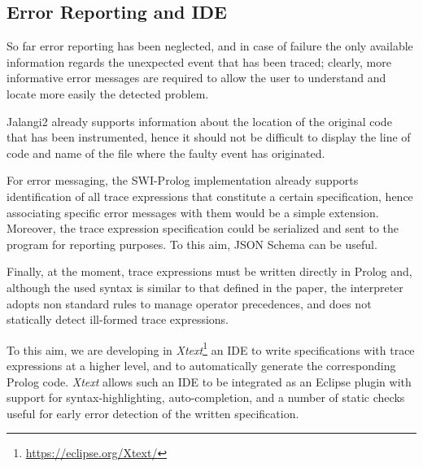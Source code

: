 
\subsection{Error Reporting and IDE}
So far error reporting has been neglected, and in case of failure the only available information
regards the unexpected event that has been traced; clearly, more informative error messages
are required to allow the user to understand and locate more easily the detected problem.

Jalangi2 already supports information about the location of the original code that has been
instrumented, hence it should not be difficult to display the line of code and name of the file where
the faulty event has originated.

For error messaging, the SWI-Prolog implementation already supports identification of
all trace expressions that constitute a certain specification, hence associating specific error messages with them
would be a simple extension.
Moreover, the trace expression specification could be serialized and sent to the program for reporting purposes.
To this aim, JSON Schema \cite{jsonschema} can be useful.

Finally, at the moment, trace expressions must be written directly in Prolog and, although the used syntax
is similar to that defined in the paper, the interpreter adopts non standard rules to manage operator precedences,
and does not statically detect ill-formed trace expressions.

To this aim, we are developing in \textit{Xtext}\footnote{\url{https://eclipse.org/Xtext/}} an IDE
to write specifications with trace expressions at a higher level, and to automatically generate
the corresponding Prolog code. \textit{Xtext} allows such an IDE to be integrated as an Eclipse plugin
with support for syntax-highlighting, auto-completion,
and a number of static checks useful for early error detection of the written specification.
